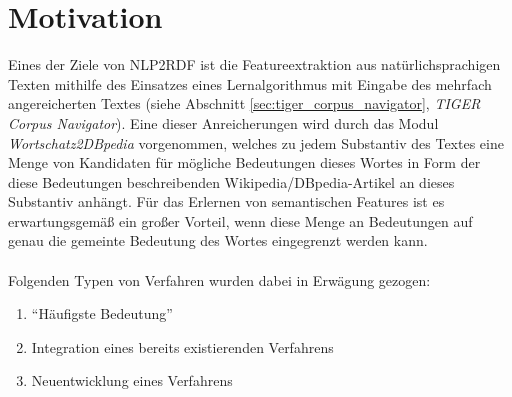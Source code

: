 \section{Motivation}
Eines der Ziele von NLP2RDF ist die Featureextraktion aus natürlichsprachigen Texten mithilfe des Einsatzes eines Lernalgorithmus mit Eingabe des mehrfach angereicherten Textes
(siehe Abschnitt \ref{sec:tiger_corpus_navigator}, \emph{TIGER Corpus Navigator}).
Eine dieser Anreicherungen wird durch das Modul \emph{Wortschatz2DBpedia} vorgenommen, welches zu jedem Substantiv des Textes eine Menge von Kandidaten für mögliche Bedeutungen dieses Wortes in Form der
diese Bedeutungen beschreibenden Wikipedia/DBpedia-Artikel an dieses Substantiv anhängt.
Für das Erlernen von semantischen Features ist es erwartungsgemäß ein großer Vorteil, wenn diese Menge an Bedeutungen auf genau die gemeinte Bedeutung des Wortes eingegrenzt werden kann.

\paragraph{}
Folgenden Typen von Verfahren wurden dabei in Erwägung gezogen:
\begin{enumerate}
 \item "`Häufigste Bedeutung"'
 \item Integration eines bereits existierenden Verfahrens
 \item Neuentwicklung eines Verfahrens
\end{enumerate}

